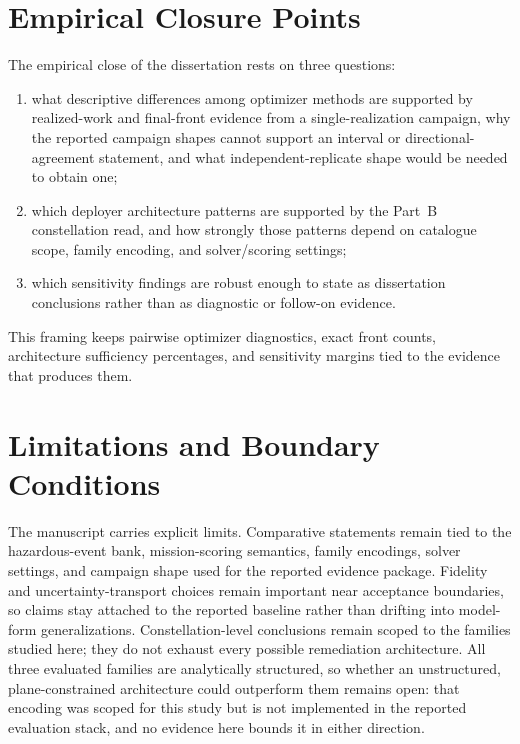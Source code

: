 \section{Empirical Closure Points} \label{se:conclusions_empirical_to_finalize}

The empirical close of the dissertation rests on three questions:

\begin{enumerate}[leftmargin=*]
    \item what descriptive differences among optimizer methods are supported by realized-work and final-front evidence from a single-realization campaign, why the reported campaign shapes cannot support an interval or directional-agreement statement, and what independent-replicate shape would be needed to obtain one;
    \item which deployer architecture patterns are supported by the Part~B constellation read, and how strongly those patterns depend on catalogue scope, family encoding, and solver/scoring settings;
    \item which sensitivity findings are robust enough to state as dissertation conclusions rather than as diagnostic or follow-on evidence.
\end{enumerate}

This framing keeps pairwise optimizer diagnostics, exact front counts, architecture sufficiency percentages, and sensitivity margins tied to the evidence that produces them.

\section{Limitations and Boundary Conditions} \label{se:conclusions_limits}

The manuscript carries explicit limits. Comparative statements remain tied to the hazardous-event bank, mission-scoring semantics, family encodings, solver settings, and campaign shape used for the reported evidence package. Fidelity and uncertainty-transport choices remain important near acceptance boundaries, so claims stay attached to the reported baseline rather than drifting into model-form generalizations. Constellation-level conclusions remain scoped to the families studied here; they do not exhaust every possible remediation architecture. All three evaluated families are analytically structured, so whether an unstructured, plane-constrained architecture could outperform them remains open: that encoding was scoped for this study but is not implemented in the reported evaluation stack, and no evidence here bounds it in either direction.

